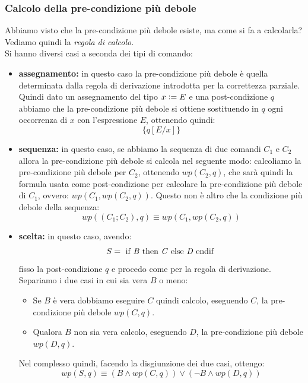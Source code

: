 				      				\subsubsection{Calcolo della pre-condizione più debole}
				      				Abbiamo visto che la pre-condizione più debole esiste, ma come si fa a calcolarla?
				      				Vediamo quindi la \textit{regola di calcolo}.\\
				      				Si hanno diversi casi a seconda dei tipi di comando:
				      				\begin{itemize}
				      					\item \textbf{assegnamento:} in questo caso la pre-condizione più debole è
				      					      quella determinata dalla regola di derivazione introdotta per la correttezza
				      					      parziale. Quindi dato un assegnamento del tipo $x\cceq E$ e una post-condizione
				      					      $q$ abbiamo che la pre-condizione più debole si ottiene sostituendo in $q$ ogni
				      					      occorrenza di $x$ con l'espressione $E$, ottenendo quindi:
				      					      \[\{q[E/x]\}\]
				      					\item \textbf{sequenza:} in questo caso, se abbiamo la sequenza di due comandi
				      					      $C_1$ e $C_2$ allora la pre-condizione più debole si calcola nel seguente modo:
				      					      calcoliamo la pre-condizione più debole per $C_2$, ottenendo $wp(C_2, q)$, che sarà
				      					      quindi la formula usata come post-condizione per calcolare la pre-condizione più
				      					      debole di $C_1$, ovvero: $wp(C_1, wp(C_2, q))$. Questo non è altro che la
				      					      condizione più debole della sequenza:
				      					      \[wp((C_1;C_2), q)\equiv wp(C_1, wp(C_2, q))\]
				      					\item \textbf{scelta:} in questo caso, avendo:
				      					      \[S=\mbox{ if \textit{B} then \textit{C} else \textit{D} endif }\]
				      					      fisso la post-condizione $q$ e procedo come per la regola di
				      					      derivazione. Separiamo i due casi in cui sia vera $B$ o meno:
				      					      \begin{itemize}
				      					          \item   Se $B$ è vera dobbiamo
				      					      eseguire $C$ quindi calcolo, eseguendo $C$, la pre-condizione più debole
				      					      $wp(C, q)$. 
				      					      
				      					      \item Qualora $B$ non sia vera calcolo, eseguendo $D$, la pre-condizione
				      					      più debole $wp(D, q)$.
				      					      \end{itemize}
				      					       Nel complesso quindi, facendo la disgiunzione dei due
				      					      casi, ottengo: 
				      					      \[wp(S, q)\equiv(B\land wp(C, q))\lor (\neg B\land wp(D, q))\]
				      					    

\end{itemize}
